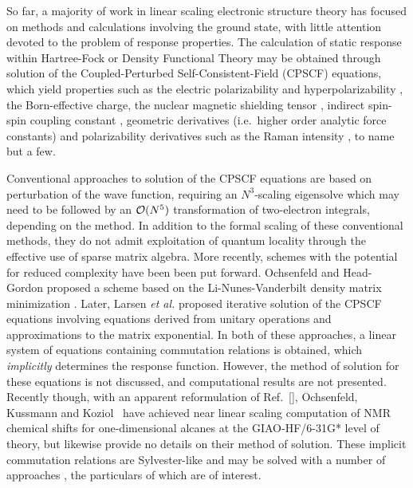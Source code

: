 \documentclass[prl,aps,preprint,showpacs,superbib]{revtex4}
\begin{document}
So far, a majority of work in linear scaling electronic structure theory 
has focused on methods and calculations involving the ground state, with little 
attention devoted to the problem of response properties.  The calculation of static
response within  Hartree-Fock or Density Functional Theory may be  obtained through solution 
of the Coupled-Perturbed Self-Consistent-Field (CPSCF) equations, which yield properties 
such as the electric polarizability and hyperpolarizability \cite{HSekino86,SKarna91}, 
the Born-effective charge, the nuclear magnetic shielding tensor \cite{KWolinski90}, 
indirect spin-spin coupling
constant \cite{CPennington91,OMalkin96}, geometric derivatives (i.e.~higher order
analytic force constants) \cite{RAmos89} and polarizability derivatives such as the Raman 
intensity \cite{MLazzeri03,OQuinet01}, to name but a few.

Conventional approaches to solution of the CPSCF equations 
\cite{HSekino86,SKarna91,JPople79} are based on perturbation of the wave 
function, requiring an $N^3$-scaling eigensolve which may need to be followed by an ${\cal O}(N^5)$ 
transformation of two-electron integrals, depending on the method. 
In addition to the formal scaling of these conventional methods, they do not admit exploitation 
of quantum locality through the effective use of sparse matrix algebra.  
More recently, schemes with the potential for reduced complexity have been been put forward.
Ochsenfeld and Head-Gordon proposed a scheme based on the Li-Nunes-Vanderbilt 
density matrix minimization \cite{Ochsenfeld97}.  Later, Larsen {\em et al.} \cite{HLarsen01a} 
proposed iterative solution of the CPSCF equations involving equations derived from 
unitary operations and approximations to the matrix exponential.    In both of these approaches, 
a linear system of equations containing commutation relations is obtained, which {\em implicitly}
determines the response function.  However, the method of solution for these equations
is not discussed, and computational results are not presented.  Recently though, 
with an apparent reformulation of Ref.~[],
Ochsenfeld, Kussmann and Koziol~\cite{COchsenfeld04} have achieved near linear scaling computation
of NMR chemical shifts for one-dimensional alcanes at the GIAO-HF/6-31G* level of theory,
but likewise provide no details on their method of solution.  These implicit commutation relations are Sylvester-like
and may be solved with a number of approaches \cite{JBrandts01}, the particulars of which are of interest. 
\end{document}
